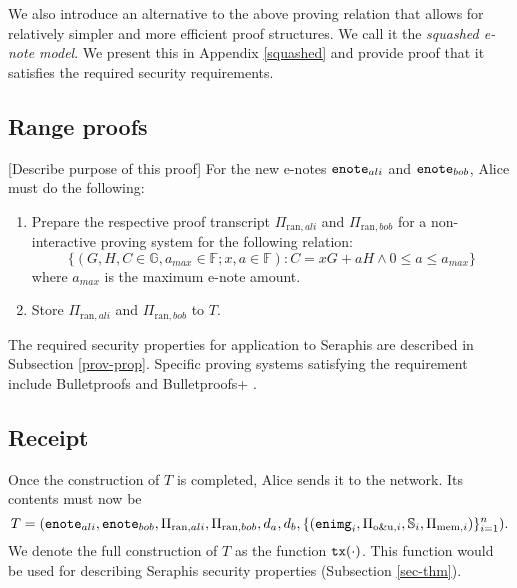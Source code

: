 \documentclass{article}
\theoremstyle{plain}
\theoremstyle{remark}
\begin{document}
We also introduce an alternative to the above proving relation that allows for relatively simpler and more efficient proof structures. We call it the \textit{squashed e-note model}. We present this in Appendix \ref{squashed} and provide proof that it satisfies the required security requirements.

\subsection{Range proofs}\label{range}
[Describe purpose of this proof] For the new e-notes ${\tt enote}_{ali}$ and ${\tt enote}_{bob}$, Alice must do the following:
\begin{enumerate}
    \item Prepare the respective proof transcript $\Pi_{\text{ran}, ali}$ and $\Pi_{\text{ran}, bob}$ for a non-interactive proving system for the following relation:
$$\{(G, H, C \in\mathbb{G}, a_{max}\in\mathbb{F}; x, a\in\mathbb{F}): C = x G + a H \wedge 0\le a \le a_{max}\}$$
	where $a_{max}$ is the maximum e-note amount.
    \item Store $\Pi_{\text{ran}, ali}$ and $\Pi_{\text{ran}, bob}$ to $T$.
\end{enumerate}

The required security properties for application to Seraphis are described in Subsection \ref{prov-prop}. Specific proving systems satisfying the requirement include Bulletproofs \cite{bp} and Bulletproofs+ \cite{bp-plus}.

\subsection{Receipt}
Once the construction of $T$ is completed, Alice sends it to the network. Its contents must now be
$$T=({\tt enote}_{ali}, {\tt enote}_{bob}, \Pi_{\text{ran}, ali}, \Pi_{\text{ran}, bob}, d_a, d_b, \{({\tt enimg}_i, \Pi_{\text{o\&u}, i}, \mathbb{S}_i, \Pi_{\text{mem}, i})\}_{i=1}^n).$$
We denote the full construction of $T$ as the function ${\tt tx}(\cdot)$. This function would be used for describing Seraphis security properties (Subsection \ref{sec-thm}).
\end{document}
